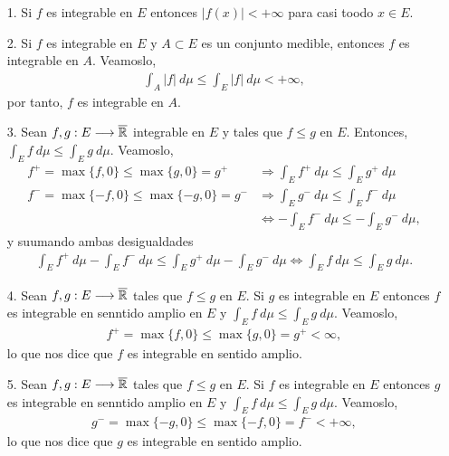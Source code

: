 \begin{obs}
\begin{enumerate}
    \item[1.] Si $f$ es integrable en $E$ entonces $|f(x)| < +\infty$ para casi toodo $x \in E$.
    \item[2.] Si $f$ es integrable en $E$ y $A \subset E$ es un conjunto medible, entonces $f$ es integrable en $A$. Veamoslo,
    \begin{align*}
        \int_{A}{|f| \ d\mu} \leq \int_{E}{|f| \ d\mu} < +\infty,
    \end{align*}
    por tanto, $f$ es integrable en $A$.
    \item[3.] Sean $f,g: E \longrightarrow \overline{\mathbb{R}}$ integrable en $E$ y tales que $f \leq g$ en $E$. Entonces, $\int_{E}{f \ d\mu} \leq \int_{E}{g \ d\mu}$. Veamoslo,
    \begin{align*}
        f^+ = \max\{f,0\} \leq \max\{g,0\} = g^+ &\Longrightarrow \int_{E}{f^+ \ d\mu} \leq \int_{E}{g^+ \ d\mu}\\
        f^- = \max\{-f,0\} \leq \max\{-g,0\} = g^- &\Longrightarrow \int_{E}{g^- \ d\mu} \leq \int_{E}{f^- \ d\mu}\\
        &\Longleftrightarrow -\int_{E}{f^- \ d\mu} \leq -\int_{E}{g^- \ d\mu},
    \end{align*}
y suumando ambas desigualdades
    \begin{align*}
        \int_{E}{f^+ \ d\mu} - \int_{E}{f^- \ d\mu} \leq \int_{E}{g^+ \ d\mu} - \int_{E}{g^- \ d\mu} \Longleftrightarrow \int_{E}{f \ d\mu} \leq \int_{E}{g \ d\mu}.
    \end{align*}
    \item[4.] Sean $f,g: E \longrightarrow \overline{\mathbb{R}}$ tales que $f \leq g$ en $E$. Si $g$ es integrable en $E$ entonces $f$ es integrable en senntido amplio en $E$ y $\int_{E}{f \ d\mu} \leq \int_{E}{g \ d\mu}$. Veamoslo,
    \begin{align*}
        f^+ = \max\{f,0\} \leq \max\{g,0\} = g^+ < \infty,
    \end{align*}
    lo que nos dice que $f$ es integrable en sentido amplio.
    \item[5.] Sean $f,g: E \longrightarrow \overline{\mathbb{R}}$ tales que $f \leq g$ en $E$. Si $f$ es integrable en $E$ entonces $g$ es integrable en senntido amplio en $E$ y $\int_{E}{f \ d\mu} \leq \int_{E}{g \ d\mu}$. Veamoslo,
    \begin{align*}
        g^- = \max\{-g,0\} \leq \max\{-f,0\} = f^- < +\infty,
    \end{align*}
    lo que nos dice que $g$ es integrable en sentido amplio.

\end{enumerate}
\end{obs}

